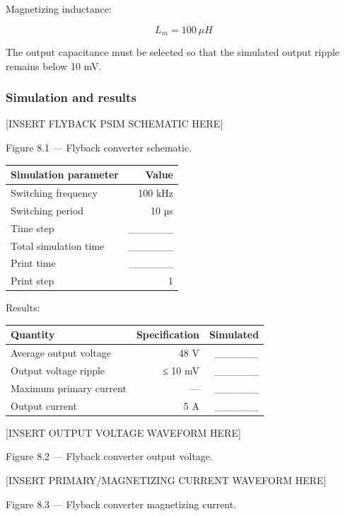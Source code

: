 \documentclass[
  paper=a4,
  oneside  ,captions=tableheading
]{scrartcl}
\newcounter{none}
\begin{document}
Magnetizing inductance:

\[
L_m=100\ \mu H
\]

The output capacitance must be selected so that the simulated output
ripple remains below 10 mV.

\subsubsection{Simulation and results}\label{simulation-and-results-2}

{[}INSERT FLYBACK PSIM SCHEMATIC HERE{]}

Figure 8.1 --- Flyback converter schematic.

{\def\LTcaptype{none} %
\begin{longtable}[]{@{}lr@{}}
\toprule\noalign{}
Simulation parameter & Value \\
\midrule\noalign{}
\endhead
\bottomrule\noalign{}
\endlastfoot
Switching frequency & 100 kHz \\
Switching period & 10 µs \\
Time step & \_\_\_\_\_\_ \\
Total simulation time & \_\_\_\_\_\_ \\
Print time & \_\_\_\_\_\_ \\
Print step & 1 \\
\end{longtable}
}

Results:

{\def\LTcaptype{none} %
\begin{longtable}[]{@{}lrr@{}}
\toprule\noalign{}
Quantity & Specification & Simulated \\
\midrule\noalign{}
\endhead
\bottomrule\noalign{}
\endlastfoot
Average output voltage & 48 V & \_\_\_\_\_\_ \\
Output voltage ripple & ≤ 10 mV & \_\_\_\_\_\_ \\
Maximum primary current & --- & \_\_\_\_\_\_ \\
Output current & 5 A & \_\_\_\_\_\_ \\
\end{longtable}
}

{[}INSERT OUTPUT VOLTAGE WAVEFORM HERE{]}

Figure 8.2 --- Flyback converter output voltage.

{[}INSERT PRIMARY/MAGNETIZING CURRENT WAVEFORM HERE{]}

Figure 8.3 --- Flyback converter magnetizing current.
\end{document}
